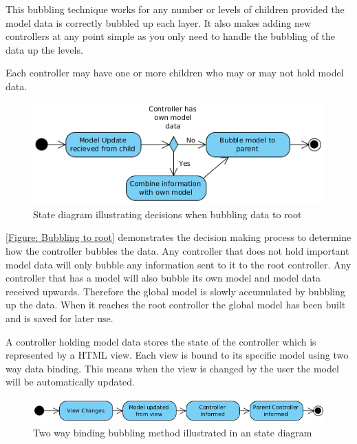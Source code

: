 This bubbling technique works for any number or levels of children provided the model data is correctly bubbled up each layer. It also makes adding new controllers at any point simple as you only need to handle the bubbling of the data up the levels.

Each controller may have one or more children who may or may not hold model data.

\begin{figure}[h]
	\centering
		\includegraphics[scale=0.6]{../figures/authoring_tool/bubbling_to_root.png} 		
	\caption{\label{Figure: Bubbling to root} State diagram illustrating decisions when bubbling data to root} 	
\end{figure}

\autoref{Figure: Bubbling to root} demonstrates the decision making process to determine how the controller bubbles the data. Any controller that does not hold important model data will only bubble any information sent to it to the root controller. Any controller that has a model will also bubble its own model and model data received upwards. Therefore the global model is slowly accumulated by bubbling up the data. When it reaches the root controller the global model has been built and is saved for later use.

A controller holding model data stores the state of the controller which is represented by a HTML view. Each view is bound to its specific model using two way data binding. This means when the view is changed by the user the model will be automatically updated.

\begin{figure}[h]
	\centering
		\includegraphics[scale=0.6]{../figures/authoring_tool/two_way_binding.png} 		
	\caption{\label{Figure: Authoring two way binding} Two way binding bubbling method illustrated in an state diagram} 	
\end{figure}

